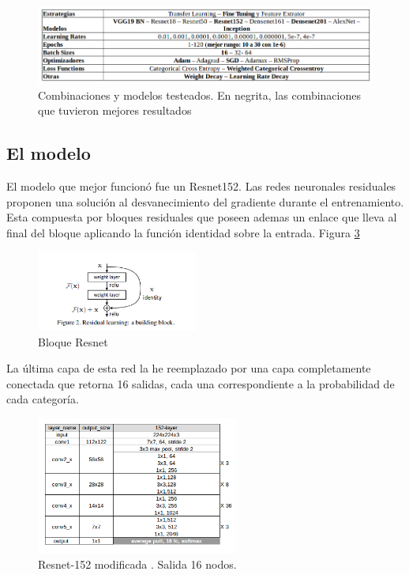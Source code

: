 \documentclass{article}
\begin{document}
\begin{figure}[H]
  \begin{center}
    \includegraphics[width=450px]{img/tested.png}
    \caption{Combinaciones y modelos testeados. En negrita, las combinaciones que tuvieron mejores resultados}
    \label{models_bench}
  \end{center}
\end{figure}

\subsection{El modelo}

El modelo que mejor funcionó fue un Resnet152. Las redes neuronales residuales proponen una solución al desvanecimiento del gradiente durante el entrenamiento. Esta compuesta por bloques residuales que poseen ademas un enlace que lleva al final del bloque aplicando la función identidad sobre la entrada. Figura \ref{conn} 

\begin{figure}[H]
  \begin{center}
    \includegraphics[width=200px]{img/resnet_connection.png}
    \caption{Bloque Resnet}
    \label{conn}
  \end{center}
\end{figure}

La última capa de esta red la he reemplazado por una capa completamente conectada que retorna 16 salidas, cada una correspondiente a la probabilidad de cada categoría. 

\begin{figure}[H]
  \begin{center}
    \includegraphics[width=250px]{img/network.png}
    \caption{Resnet-152 modificada . Salida 16 nodos. }
    \label{conn}
  \end{center}
\end{figure}
\end{document}

